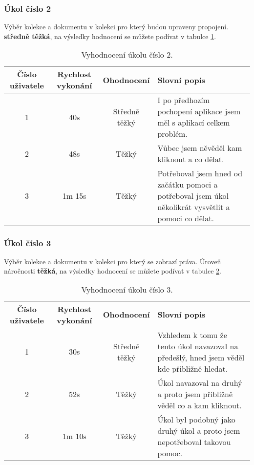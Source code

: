 \subsubsection{Úkol číslo 2} Výběr kolekce a dokumentu v kolekci pro který budou upraveny propojení. \textbf{středně těžká}, na výsledky hodnocení se můžete podívat v tabulce \ref{ukol-2}.
\begin{table}[htp]
\begin{center}
\begin{tabular}{ || c || c | c | m{5cm} || }
\hline
Číslo uživatele & Rychlost vykonání & Ohodnocení & Slovní popis \\ [0.5ex]
\hline
\hline
1 & 40s & Středně těžký & I po předhozím pochopení aplikace jsem měl s aplikací celkem problém.\\
\hline
2 & 48s & Těžký & Vůbec jsem něvěděl kam kliknout a co dělat. \\
\hline
3 & 1m 15s & Těžký & Potřeboval jsem hned od začátku pomoci a potřeboval jsem úkol několikrát vysvětlit a pomoci co dělat. \\
\hline
\end{tabular}
\end{center}
\caption{Vyhodnocení úkolu číslo 2.}
\label{ukol-2}
\end{table}
\subsubsection{Úkol číslo 3} Výběr kolekce a dokumentu v kolekci pro který se zobrazí práva. Úroveň náročnosti \textbf{těžká}, na výsledky hodnocení se můžete podívat v tabulce \ref{ukol-3}.
\begin{table}[htp]
\begin{center}
\begin{tabular}{ || c || c | c | m{5cm} || }
\hline
Číslo uživatele & Rychlost vykonání & Ohodnocení & Slovní popis \\ [0.5ex]
\hline
\hline
1 & 30s & Středně těžký & Vzhledem k tomu že tento úkol navazoval na předešlý, hned jsem věděl kde přibližně hledat. \\
\hline
2 & 52s & Těžký & Úkol navazoval na druhý a proto jsem přibližně věděl co a kam kliknout. \\
\hline
3 & 1m 10s & Těžký & Úkol byl podobný jako druhý úkol a proto jsem nepotřeboval takovou pomoc. \\
\hline
\end{tabular}
\end{center}
\caption{Vyhodnocení úkolu číslo 3.}
\label{ukol-3}
\end{table}

